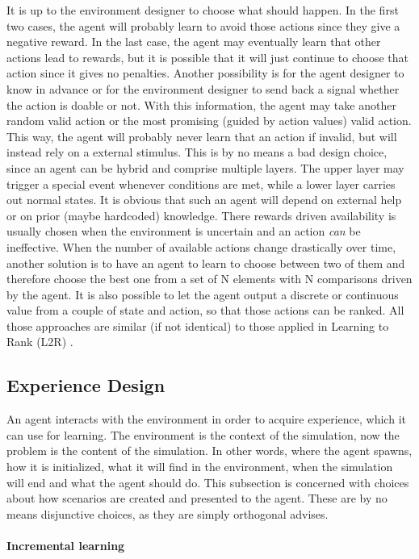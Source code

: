 It is up to the environment designer to choose what should happen. In the first two cases, the agent will probably learn to avoid those actions since they give a negative reward.
In the last case, the agent may eventually learn that other actions lead to rewards, but it is possible that it will just continue to choose that action since it gives no penalties.
Another possibility is for the agent designer to know in advance or for the environment designer to send back a signal whether the action is doable or not.
With this information, the agent may take another random valid action or the most promising (guided by action values) valid action.
This way, the agent will probably never learn that an action if invalid, but will instead rely on a external stimulus.
This is by no means a bad design choice, since an agent can be hybrid and comprise multiple layers.
The upper layer may trigger a special event whenever conditions are met, while a lower layer carries out normal states.
It is obvious that such an agent will depend on external help or on prior (maybe hardcoded) knowledge.
There rewards driven availability is usually chosen when the environment is uncertain and an action \textit{can} be ineffective.
When the number of available actions change drastically over time, another solution is to have an agent to learn to choose between two of them and therefore choose the best one from a set of N elements with N comparisons driven by the agent. It is also possible to let the agent output a discrete or continuous value from a couple of state and action, so that those actions can be ranked. All those approaches are similar (if not identical) to those applied in Learning to Rank (L2R) \cite{akiyama2016learning}.

\subsection{Experience Design}

An agent interacts with the environment in order to acquire experience, which it can use for learning.
The environment is the context of the simulation, now the problem is the content of the simulation.
In other words, where the agent spawns, how it is initialized, what it will find in the environment, when the simulation will end and what the agent should do.
This subsection is concerned with choices about how scenarios are created and presented to the agent.
These are by no means disjunctive choices, as they are simply orthogonal advises.

\paragraph{Incremental learning}

